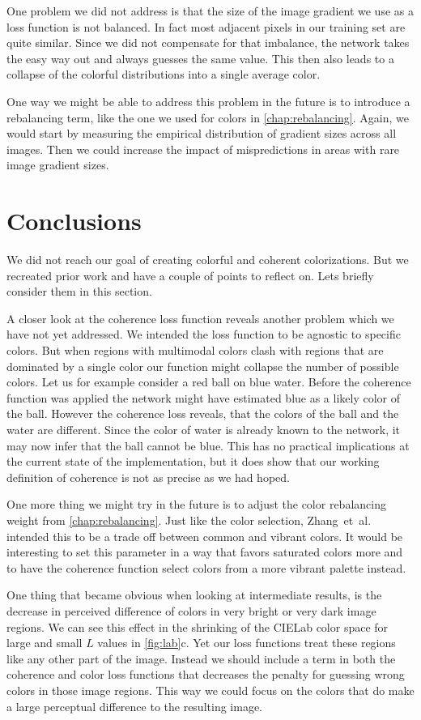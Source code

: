 \documentclass[11pt]{article}
\begin{document}
One problem we did not address is that the size of the image gradient we use as a loss function is not balanced. In fact most adjacent pixels in our training set are quite similar. Since we did not compensate for that imbalance, the network takes the easy way out and always guesses the same value. This then also leads to a collapse of the colorful distributions into a single average color.

One way we might be able to address this problem in the future is to introduce a rebalancing term, like the one we used for colors in \autoref{chap:rebalancing}. Again, we would start by measuring the empirical distribution of gradient sizes across all images. Then we could increase the impact of mispredictions in areas with rare image gradient sizes.

\section{Conclusions}

We did not reach our goal of creating colorful and coherent colorizations. But we recreated prior work and have a couple of points to reflect on. Lets briefly consider them in this section.

A closer look at the coherence loss function reveals another problem which we have not yet addressed. We intended the loss function to be agnostic to specific colors. But when regions with multimodal colors clash with regions that are dominated by a single color our function might collapse the number of possible colors. Let us for example consider a red ball on blue water. Before the coherence function was applied the network might have estimated blue as a likely color of the ball. However the coherence loss reveals, that the colors of the ball and the water are different. Since the color of water is already known to the network, it may now infer that the ball cannot be blue. This has no practical implications at the current state of the implementation, but it does show that our working definition of coherence is not as precise as we had hoped.

One more thing we might try in the future is to adjust the color rebalancing weight from \autoref{chap:rebalancing}. Just like the color selection, Zhang~et~al.\cite{zhang2016colorful} intended this to be a trade off between common and vibrant colors. It would be interesting to set this parameter in a way that favors saturated colors more and to have the coherence function select colors from a more vibrant palette instead.

One thing that became obvious when looking at intermediate results, is the decrease in perceived difference of colors in very bright or very dark image regions. We can see this effect in the shrinking of the CIELab color space for large and small $L$ values in \autoref{fig:lab}c. Yet our loss functions treat these regions like any other part of the image. Instead we should include a term in both the coherence and color loss functions that decreases the penalty for guessing wrong colors in those image regions. This way we could focus on the colors that do make a large perceptual difference to the resulting image.



\end{document}
